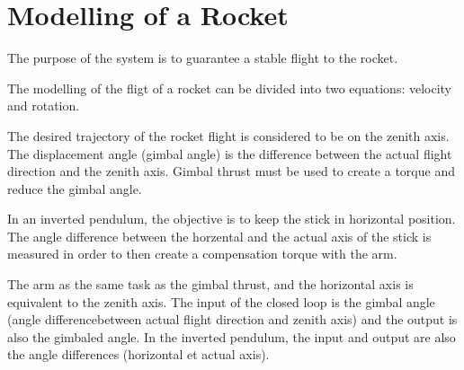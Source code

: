 \section{Modelling of a Rocket}
The purpose of the system is to guarantee a stable flight to the rocket.

The modelling of the fligt of a rocket can be divided into two equations: velocity and rotation.

The desired trajectory of the rocket flight is considered to be on the zenith axis. The displacement angle (gimbal angle) is the difference between the actual flight direction and the zenith axis. Gimbal thrust must be used to create a torque and reduce the gimbal angle. 

In an inverted pendulum, the objective is to keep the stick in horizontal position. The angle difference between the horzental and the actual axis of the stick is measured in order to then create a compensation torque with the arm.

The arm as the same task as the gimbal thrust, and the horizontal axis is equivalent to the zenith axis.
The input of the closed loop is the gimbal angle (angle differencebetween actual flight direction and zenith axis) and the output is also the gimbaled angle. In the inverted pendulum, the input and output are also the angle differences (horizontal et actual axis). 